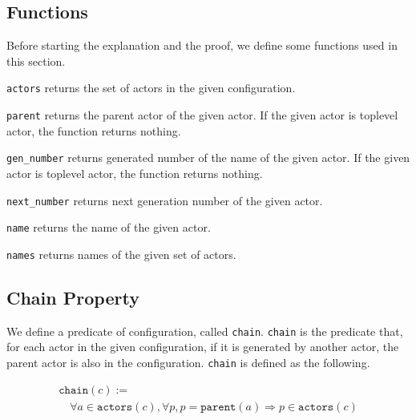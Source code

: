 \subsection{Functions}

Before starting the explanation and the proof, we define some functions used in this section.

\begin{description}[style=nextline,leftmargin=12pt,parsep=0pt]
\item[\texttt{actors} $: \textit{Configuration} \rightarrow \textit{Set(Actor)}$]
  \texttt{actors} returns the set of actors in the given configuration.
\item[\texttt{parent} $: \textit{Actor} \rightarrow \textit{Actor}$]
  \texttt{parent} returns the parent actor of the given actor.
  If the given actor is toplevel actor, the function returns nothing. %
\item[\texttt{gen\_number} $: \textit{Actor} \rightarrow \mathbb{N}$]
  \texttt{gen\_number} returns generated number of the name of the given actor.
  If the given actor is toplevel actor, the function returns nothing.
\item[\texttt{next\_number} $: \textit{Actor} \rightarrow \mathbb{N}$]
  \texttt{next\_number} returns next generation number of the given actor.
\item[\texttt{name} $: \textit{Actor} \rightarrow \textit{Name}$]
  \texttt{name} returns the name of the given actor.
\item[\texttt{names} $: \textit{Set(Actor)} \rightarrow \textit{Set(Name)}$]
  \texttt{names} returns names of the given set of actors.
\end{description}

\subsection{Chain Property}
We define a predicate of configuration, called \texttt{chain}.
\texttt{chain} is the predicate that, for each actor in the given configuration, if it is generated by another actor, the parent actor is also in the configuration.
\texttt{chain} is defined as the following.

\begin{displaymath}
  \begin{array}{l}
    \texttt{chain}(c) := \\
    \quad \forall a \in \texttt{actors}(c), \forall p, p = \texttt{parent}(a) \Rightarrow p \in \texttt{actors}(c)
  \end{array}
\end{displaymath}

